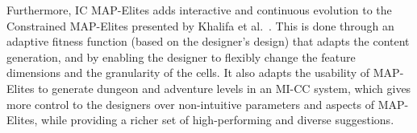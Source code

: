 Furthermore, IC MAP-Elites adds interactive and continuous evolution to the Constrained MAP-Elites presented by Khalifa et al.~\cite{p6Khalifa2018}. This is done through an adaptive fitness function (based on the designer's design) that adapts the content generation, and by enabling the designer to flexibly change the feature dimensions and the granularity of the cells. It also adapts the usability of MAP-Elites to generate dungeon and adventure levels in an MI-CC system, which gives more control to the designers over non-intuitive parameters and aspects of MAP-Elites, while providing a richer set of high-performing and diverse suggestions.





